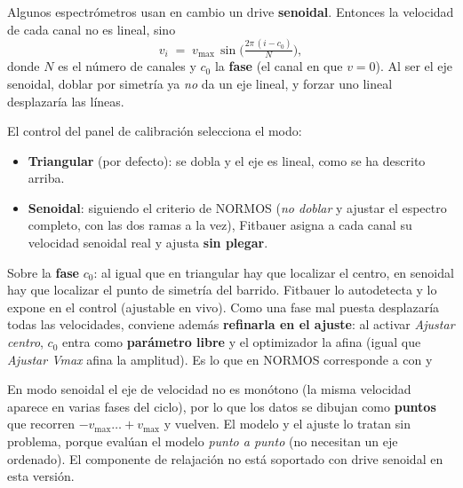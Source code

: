Algunos espectrómetros usan en cambio un drive \textbf{senoidal}. Entonces la
velocidad de cada canal no es lineal, sino
\[
  v_i \;=\; v_{\max}\,\sin\!\Big(\tfrac{2\pi\,(i-c_0)}{N}\Big),
\]
donde $N$ es el número de canales y $c_0$ la \textbf{fase} (el canal en que
$v=0$). Al ser el eje senoidal, doblar por simetría ya \emph{no} da un eje
lineal, y forzar uno lineal desplazaría las líneas.


El control  del panel de calibración selecciona el modo:

\begin{itemize}[nosep]
  \item \textbf{Triangular} (por defecto): se dobla y el eje es lineal, como se ha
        descrito arriba.
  \item \textbf{Senoidal}: siguiendo el criterio de NORMOS (\emph{no doblar} y
        ajustar el espectro completo, con las dos ramas a la vez), Fitbauer asigna
        a cada canal su velocidad senoidal real y ajusta \textbf{sin plegar}.
\end{itemize}

Sobre la \textbf{fase} $c_0$: al igual que en triangular hay que localizar el
centro, en senoidal hay que localizar el punto de simetría del barrido. Fitbauer
lo autodetecta y lo expone en el control  (ajustable en vivo).
Como una fase mal puesta desplazaría todas las velocidades, conviene además
\textbf{refinarla en el ajuste}: al activar \emph{Ajustar centro}, $c_0$ entra
como \textbf{parámetro libre} y el optimizador la afina (igual que \emph{Ajustar
Vmax} afina la amplitud). Es lo que en NORMOS corresponde a 
con  y 

\begin{nota}
En modo senoidal el eje de velocidad no es monótono (la misma velocidad aparece
en varias fases del ciclo), por lo que los datos se dibujan como \textbf{puntos}
que recorren $-v_{\max}\!\dots\!+v_{\max}$ y vuelven. El modelo y el ajuste lo
tratan sin problema, porque evalúan el modelo \emph{punto a punto} (no necesitan
un eje ordenado). El componente de relajación no está soportado con drive
senoidal en esta versión.
\end{nota}

